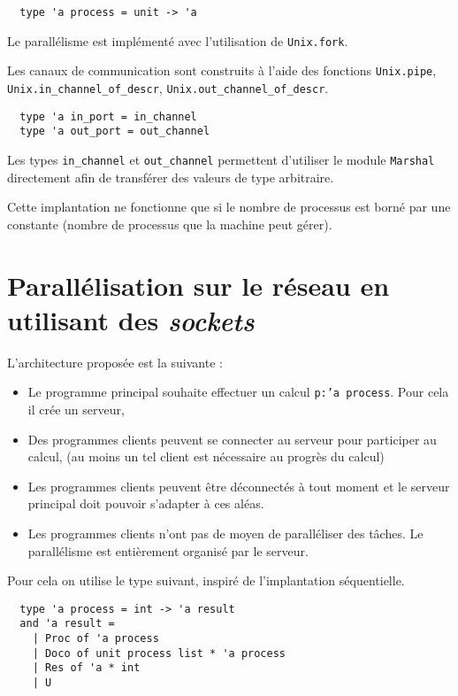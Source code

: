 \documentclass[11pt]{article}
\begin{document}
\begin{lstlisting}
  type 'a process = unit -> 'a
\end{lstlisting}

Le parall\'elisme est impl\'ement\'e avec l'utilisation de {\tt Unix.fork}.

\smallskip

Les canaux de communication sont construits \`a l'aide des fonctions
{\tt Unix.pipe},
{\tt Unix.in\_channel\_of\_descr}, {\tt Unix.out\_channel\_of\_descr}.

\begin{lstlisting}
  type 'a in_port = in_channel
  type 'a out_port = out_channel
\end{lstlisting}

Les types {\tt in\_channel} et {\tt out\_channel} permettent d'utiliser
le module {\tt Marshal} directement afin de transf\'erer des valeurs
de type arbitraire.

\smallskip

Cette implantation ne fonctionne que si le nombre de processus est
born\'e par une constante (nombre de processus que la machine peut g\'erer).

\section{Parall\'elisation sur le r\'eseau en utilisant des {\em sockets}}

L'architecture propos\'ee est la suivante :

\begin{itemize}
  \item Le programme principal souhaite effectuer un calcul
    {\tt p:'a process}. Pour cela il cr\'ee un serveur,
  \item Des programmes clients peuvent se connecter au serveur pour
    participer au calcul,
    (au moins un tel client est n\'ecessaire au progr\`es du calcul)
  \item Les programmes clients peuvent \^etre d\'econnect\'es \`a tout moment
    et le serveur principal doit pouvoir s'adapter \`a ces al\'eas.
  \item Les programmes clients n'ont pas de moyen de parall\'eliser
    des t\^aches. Le parall\'elisme est enti\`erement organis\'e
    par le serveur.
\end{itemize}

Pour cela on utilise le type suivant, inspir\'e de l'implantation
s\'equentielle.

\begin{lstlisting}
  type 'a process = int -> 'a result
  and 'a result =
    | Proc of 'a process
    | Doco of unit process list * 'a process
    | Res of 'a * int
    | U
\end{lstlisting}
\end{document}
